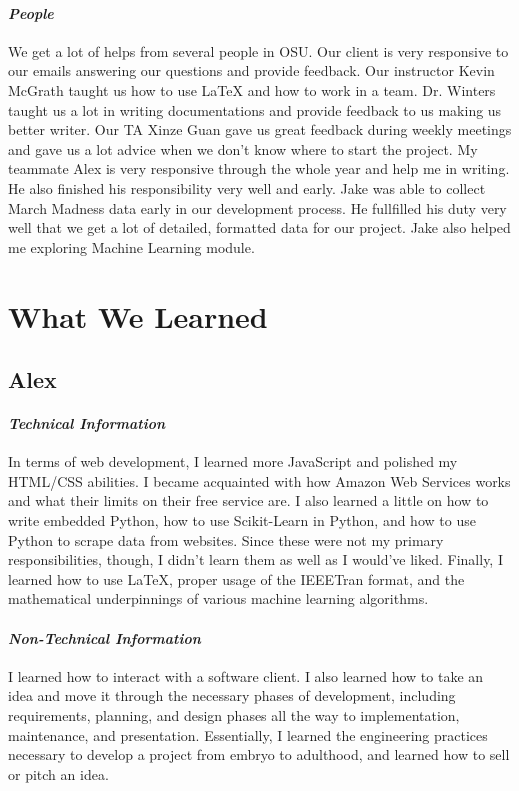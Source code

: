 \documentclass[onecolumn, draftclsnofoot,10pt, compsoc]{IEEEtran}
\begin{document}
\paragraph{\emph{People}}
We get a lot of helps from several people in OSU. Our client is very responsive to our emails answering our questions and provide feedback. Our instructor Kevin McGrath taught us how to use LaTeX and how to work in a team. Dr. Winters taught us a lot in writing documentations and provide feedback to us making us better writer. Our TA Xinze Guan gave us great feedback during weekly meetings and gave us a lot advice when we don't know where to start the project. My teammate Alex is very responsive through the whole year and help me in writing. He also finished his responsibility very well and early. Jake was able to collect March Madness data early in our development process. He fullfilled his duty very well that we get a lot of detailed, formatted data for our project. Jake also helped me exploring Machine Learning module.

\section{What We Learned}
\subsection{Alex}
\paragraph{\emph{Technical Information}}
In terms of web development, I learned more JavaScript and polished my HTML/CSS abilities. I became acquainted with how Amazon Web Services works and what their limits on their free service are. I also learned a little on how to write embedded Python, how to use Scikit-Learn in Python, and how to use Python to scrape data from websites. Since these were not my primary responsibilities, though, I didn't learn them as well as I would've liked. Finally, I learned how to use LaTeX, proper usage of the IEEETran format, and the mathematical underpinnings of various machine learning algorithms.

\paragraph{\emph{Non-Technical Information}}
I learned how to interact with a software client. I also learned how to take an idea and move it through the necessary phases of development, including requirements, planning, and design phases all the way to implementation, maintenance, and presentation. Essentially, I learned the engineering practices necessary to develop a project from embryo to adulthood, and learned how to sell or pitch an idea.
\end{document}
